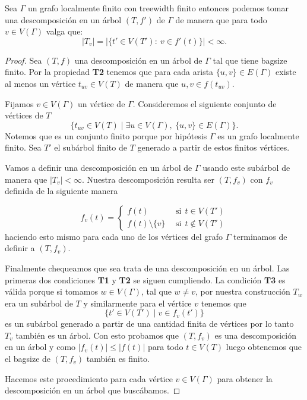 \documentclass[tesis.tex]{subfiles}
\begin{document}
\begin{prop}\label{prop_tw_finitos_bolsones}
	Sea $\Gamma$ un grafo localmente finito con treewidth finito entonces podemos tomar una descomposición en un árbol $(T,f')$ de $\Gamma$ de manera que para todo $v \in V(\Gamma)$ valga que:
	\[
	|T_{v}| = | \{  t' \in V(T') : \ v \in f'(t)  \} | < \infty.
	\]
\end{prop}
\begin{proof}
	Sea $(T,f)$ una descomposición en un árbol de $\Gamma$ tal que tiene bagsize finito.
	Por la propiedad \textbf{T2} tenemos que para cada arista 
	$\{u,v\} \in E(\Gamma)$ existe al menos un vértice $t_{uv} \in V(T)$ de manera que $u,v \in f(t_{uv})$.
	
	Fijamos $v \in V(\Gamma)$ un vértice  de $\Gamma$.
	Consideremos el siguiente conjunto de vértices de $T$
	\[
		\{  t_{uv} \in V(T) \mid \exists u \in V(\Gamma), \ \{ u,v \} \in E(\Gamma)  \}.
	\]
	Notemos que es un conjunto finito porque por hipótesis $\Gamma$ es un grafo localmente finito.
	Sea $T'$ el subárbol finito de $T$ generado a partir de estos finitos vértices.
	
	Vamos a definir una descomposición en un árbol de $\Gamma$ usando este subárbol de manera que $|T_{v}| < \infty$.
	Nuestra descomposición resulta ser $(T,f_{v})$ con $f_{v}$ definida de la siguiente manera
	
	\[
	f_{v}(t) = 
	\begin{cases}
		f(t)  \ \  &\text{si} \ \  t \in V(T') \\
		f(t) \setminus \{  v \} \ \  &\text{si} \ \  t \notin V(T')
	\end{cases}
	\]
	haciendo esto mismo para cada uno de los vértices del grafo $\Gamma$ terminamos de definir a $(T,f_{v})$.
	
	Finalmente chequeamos que sea trata de una descomposición en un árbol.
	Las primeras dos condiciones \textbf{T1} y \textbf{T2} se siguen cumpliendo.
	La condición \textbf{T3} es válida porque si tomamos $w \in V(\Gamma)$, tal que $w \neq v$, por nuestra construcción $T_{w}$ era un subárbol de $T$ y similarmente para el vértice $v$ tenemos que 
	\[
		\{ t' \in V(T') \mid v \in f_{v}(t') \}
	\]	
	es un subárbol generado a partir de una cantidad finita de vértices por lo tanto $T_{v}$ también es un árbol.
	Con esto probamos que $(T,f_{v})$ es una descomposición en un árbol y como $|f_{v}(t)| \le |f(t)|$ para todo $t \in V(T)$ luego obtenemos que el bagsize de $(T,f_{v})$ también es finito.
	
	Hacemos este procedimiento para cada vértice $v \in V(\Gamma)$ para obtener la descomposición en un árbol que buscábamos.
\end{proof}
\end{document}
